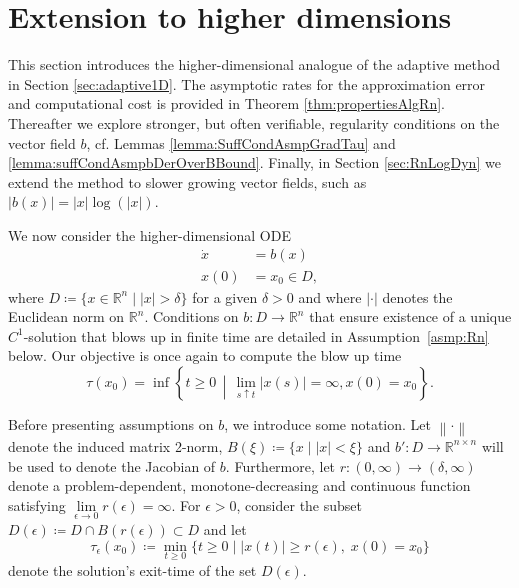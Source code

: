 \documentclass[a4paper, oneside, reqno]{amsart}
\newcommand{\abs}[1]{\left\lvert#1\right\rvert}
\newcommand{\norm}[1]{\left\|#1\right\|}
\newcommand{\R}{\mathbb{R}}
\theoremstyle{remark}
\begin{document}
\section{Extension to higher dimensions}
\label{sec:higherDim}

This section introduces the higher-dimensional analogue of the adaptive method in Section \ref{sec:adaptive1D}. 
The asymptotic rates for the approximation error and computational cost is provided in Theorem \ref{thm:propertiesAlgRn}. 
Thereafter we explore stronger, but often verifiable, regularity conditions on the vector field \(b\), cf. Lemmas \ref{lemma:SuffCondAsmpGradTau} and \ref{lemma:suffCondAsmpbDerOverBBound}.
Finally, in Section \ref{sec:RnLogDyn} we extend the method to slower growing vector fields, such as \(\abs{b(x)} = \abs{x}\log(\abs{x})\).

We now consider the higher-dimensional ODE 
\begin{equation}
\label{eq:systemODE}
    \begin{split}
        \dot{x} &= b(x) \\
        x(0) &= x_0 \in D,
    \end{split}
\end{equation}
where $D \coloneq \{x \in \R^n \mid |x| >\delta\}$ for 
a given $\delta >0$ and where \(\abs{\cdot}\) denotes the Euclidean norm on \(\R^n\). Conditions on $b:D \to \R^n$ that ensure existence of a unique $C^1$-solution
that blows up in finite time are detailed in Assumption~\ref{asmp:Rn} below. Our objective is once again to compute the blow up time 
\begin{equation*}
\tau(x_0) = \inf \left\{t \geq 0 \,\middle\vert\, \lim_{s \uparrow t} |x(s)| = \infty, x(0) = x_0\right\}.
\end{equation*}

Before presenting assumptions on \(b\), we introduce some notation. 
Let \(\norm{\cdot}\) denote the induced matrix 2-norm,  
$B(\xi) \coloneqq \{x \mid |x| < \xi\}$ and \(b': D \to \R^{n \times n}\) will be used to denote the Jacobian of \(b\). Furthermore, let \(r:(0,\infty) \to (\delta,\infty)\) denote a problem-dependent, monotone-decreasing and continuous function 
satisfying \(\underset{\epsilon\to 0}{\lim}r(\epsilon) = \infty\).
For $\epsilon >0$, consider the subset $D(\epsilon) \coloneqq D \cap B(r(\epsilon)) \subset D$
and let
\[
\tau_\epsilon(x_0) \coloneqq \underset{t\geq0}{\min}\{ t \ge 0 \mid |x(t)| \geq r(\epsilon), \; x(0) = x_0\} 
\]
denote the solution's exit-time of the set $D(\epsilon)$.
\end{document}
